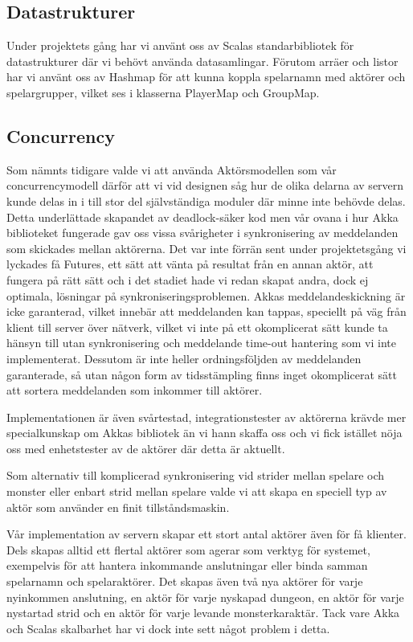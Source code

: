 \documentclass[a4paper]{article}
\begin{document}
\subsection{Datastrukturer}
Under projektets gång har vi använt oss av Scalas standarbibliotek för datastrukturer där vi behövt använda datasamlingar. 
Förutom arräer och listor har vi använt oss av Hashmap för att kunna koppla spelarnamn med aktörer och spelargrupper, vilket ses i klasserna
PlayerMap och GroupMap.

\subsection{Concurrency}
Som nämnts tidigare valde vi att använda Aktörsmodellen som vår concurrencymodell därför att vi vid designen såg hur de olika
delarna av servern kunde delas in i till stor del självständiga moduler där minne inte behövde delas. Detta underlättade
skapandet av deadlock-säker kod men vår ovana i hur Akka biblioteket fungerade gav oss vissa svårigheter i synkronisering av
meddelanden som skickades mellan aktörerna. Det var inte förrän sent under projektetsgång vi lyckades få Futures, ett sätt att 
vänta på resultat från en annan aktör, att fungera på rätt sätt och i det stadiet hade vi redan skapat andra, dock ej optimala,
lösningar på synkroniseringsproblemen. Akkas meddelandeskickning är icke garanterad, vilket innebär att meddelanden kan
tappas, speciellt på väg från klient till server över nätverk, vilket vi inte på ett okomplicerat sätt kunde ta hänsyn till utan
synkronisering och meddelande time-out hantering som vi inte implementerat. Dessutom är inte heller ordningsföljden av meddelanden
garanterade, så utan någon form av tidsstämpling finns inget okomplicerat sätt att sortera meddelanden som inkommer till aktörer.

Implementationen är även svårtestad, integrationstester av aktörerna krävde mer specialkunskap om Akkas bibliotek än vi
hann skaffa oss och vi fick istället nöja oss med enhetstester av de aktörer där detta är aktuellt.

Som alternativ till komplicerad synkronisering vid strider mellan spelare och monster eller enbart strid mellan spelare valde vi att
skapa en speciell typ av aktör som använder en finit tillståndsmaskin.

Vår implementation av servern skapar ett stort antal aktörer även för få klienter. Dels skapas alltid ett flertal aktörer som
agerar som verktyg för systemet, exempelvis för att hantera inkommande anslutningar eller binda samman spelarnamn och spelaraktörer.
Det skapas även två nya aktörer för varje nyinkommen anslutning, en aktör för varje nyskapad dungeon, en aktör för varje nystartad strid
och en aktör för varje levande monsterkaraktär.
Tack vare Akka och Scalas skalbarhet har vi dock inte sett något problem i detta.
\end{document}
